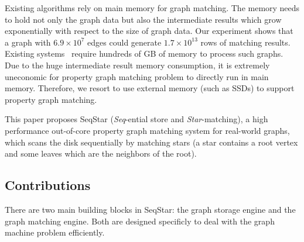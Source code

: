 
Existing algorithms rely on main memory for graph matching. The memory needs to hold not only the graph data but also the intermediate results which grow exponentially with respect to the size of graph data.
Our experiment shows that a graph with $6.9 \times 10^{7}$ edges could generate $1.7 \times 10^{13}$ rows of matching results.
Existing systems~\cite{DBLP:conf/sosp/TeixeiraFSSZA15,DBLP:conf/sigmod/DiasTGM019,DBLP:journals/pvldb/MhedhbiS19} require hundreds of GB of memory to process such graphs.
Due to the huge intermediate result memory consumption, it is extremely uneconomic for property graph matching problem to directly run in main memory. Therefore, we resort to use external memory (such as SSDs) to support property graph matching.

This paper proposes SeqStar (\emph{Seq}-ential store and \emph{Star}-matching), a high performance out-of-core property graph matching system for real-world graphs, which scans the disk sequentially by matching stars (a star contains a root vertex and some leaves which are the neighbors of the root).


\subsection*{Contributions}
There are two main building blocks in SeqStar:
the graph storage engine and the graph matching engine. Both are designed specificly to deal with the graph machine problem efficiently.

